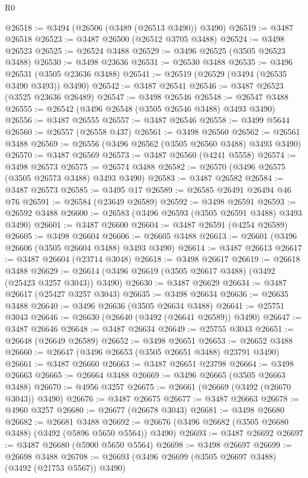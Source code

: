 \begin{lexlean}{R0}
\begin{coremodule}
@26518 := @3494 (@26506 (@3489 (@26513 @3490)) @3490)
@26519 := @3487 @26518
@26523 := @3487 @26500 (@26512 @3705 @3488)
@26524 := @3498 @26523
@26525 := @26524 @3488
@26529 := @3496 @26525 (@3505 @26523 @3488)
@26530 := @3498 @23636
@26531 := @26530 @3488
@26535 := @3496 @26531 (@3505 @23636 @3488)
@26541 := @26519 (@26529 (@3494 (@26535 @3490 @3493)) @3490)
@26542 := @3487 @26541
@26546 := @3487 @26523 (@3525 @23636 @26489)
@26547 := @3498 @26546
@26548 := @26547 @3488
@26555 := @26542 (@3496 @26548 (@3505 @26546 @3488) @3493 @3490)
@26556 := @3487 @26555
@26557 := @3487 @26546
@26558 := @3499 @5644
@26560 := @26557 (@26558 @437)
@26561 := @3498 @26560
@26562 := @26561 @3488
@26569 := @26556 (@3496 @26562 (@3505 @26560 @3488) @3493 @3490)
@26570 := @3487 @26569
@26573 := @3487 @26560 (@4241 @5558)
@26574 := @3498 @26573
@26575 := @26574 @3488
@26582 := @26570 (@3496 @26575 (@3505 @26573 @3488) @3493 @3490)
@26583 := @3487 @26582
@26584 := @3487 @26573
@26585 := @3495 @17
@26589 := @26585 @26491 @26494 @46 @76
@26591 := @26584 (@23649 @26589)
@26592 := @3498 @26591
@26593 := @26592 @3488
@26600 := @26583 (@3496 @26593 (@3505 @26591 @3488) @3493 @3490)
@26601 := @3487 @26600
@26604 := @3487 @26591 (@4254 @26589)
@26605 := @3498 @26604
@26606 := @26605 @3488
@26613 := @26601 (@3496 @26606 (@3505 @26604 @3488) @3493 @3490)
@26614 := @3487 @26613
@26617 := @3487 @26604 (@23714 @3048)
@26618 := @3498 @26617
@26619 := @26618 @3488
@26629 := @26614 (@3496 @26619 (@3505 @26617 @3488) (@3492 (@25423 @3257 @3043)) @3490)
@26630 := @3487 @26629
@26634 := @3487 @26617 (@25427 @3257 @3043)
@26635 := @3498 @26634
@26636 := @26635 @3488
@26640 := @3496 @26636 (@3505 @26634 @3488)
@26641 := @25751 @3043
@26646 := @26630 (@26640 (@3492 (@26641 @26589)) @3490)
@26647 := @3487 @26646
@26648 := @3487 @26634
@26649 := @25755 @3043
@26651 := @26648 (@26649 @26589)
@26652 := @3498 @26651
@26653 := @26652 @3488
@26660 := @26647 (@3496 @26653 (@3505 @26651 @3488) @23791 @3490)
@26661 := @3487 @26660
@26663 := @3487 @26651 @23798
@26664 := @3498 @26663
@26665 := @26664 @3488
@26669 := @3496 @26665 (@3505 @26663 @3488)
@26670 := @4956 @3257
@26675 := @26661 (@26669 (@3492 (@26670 @3043)) @3490)
@26676 := @3487 @26675
@26677 := @3487 @26663
@26678 := @4960 @3257
@26680 := @26677 (@26678 @3043)
@26681 := @3498 @26680
@26682 := @26681 @3488
@26692 := @26676 (@3496 @26682 (@3505 @26680 @3488) (@3492 (@5896 @5650 @5564)) @3490)
@26693 := @3487 @26692
@26697 := @3487 @26680 (@5900 @5650 @5564)
@26698 := @3498 @26697
@26699 := @26698 @3488
@26708 := @26693 (@3496 @26699 (@3505 @26697 @3488) (@3492 (@21753 @5567)) @3490)

\end{coremodule}
\end{lexlean}
